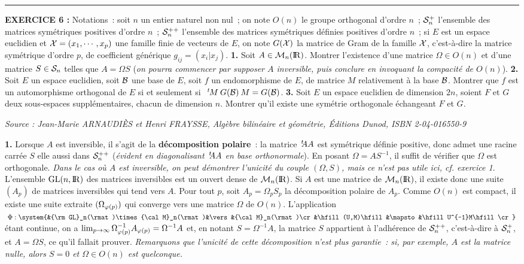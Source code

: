 \documentclass{article}
\begin{document}
\bsk
\hrule
\bsk

{\bf EXERCICE 6 :}\msk
Notations~: soit $n$ un entier naturel non nul~; on note\ssk\new
$O(n)$ le groupe orthogonal d'ordre $n$~;\ssk\new
${\cal S}_n^+$ l'ensemble des matrices sym\'etriques positives d'ordre $n$~;\ssk\new
${\cal S}_n^{++}$ l'ensemble des matrices sym\'etriques d\'efinies positives d'ordre $n$~;\ssk\new
si $E$ est un espace euclidien et ${\cal X}=(x_1,\cdots,x_p)$ une famille finie de vecteurs de $E$, on note $G({\cal X})$ la matrice de Gram de la famille ${\cal X}$, c'est-\`a-dire la matrice sym\'etrique d'ordre $p$, de coefficient g\'en\'erique $g_{ij}=(x_i|x_j)$.
\msk
{\bf 1.} Soit $A\in{\cal M}_n({\rm I\kern-0.6mm R})$. Montrer l'existence d'une matrice $\Omega\in O(n)$ et d'une matrice $S\in{\cal S}_n$ telles que $A=\Omega S$ ({\it on pourra commencer par supposer $A$ inversible, puis conclure en invoquant la compacit\'e de $O(n)$}).\msk
{\bf 2.} Soit $E$ un espace euclidien, soit ${\cal B}$ une base de $E$, soit $f$ un endomorphisme de $E$, de matrice $M$ relativement \`a la base ${\cal B}$. Montrer que $f$ est un automorphisme orthogonal de $E$ si et seulement si $\;\,{}^t\!\!\>M\>G({\cal B})\>M=G({\cal B})$.\msk
{\bf 3.} Soit $E$ un espace euclidien de dimension $2n$, soient $F$ et $G$ deux sous-espaces suppl\'ementaires, chacun de dimension $n$. Montrer qu'il existe une sym\'etrie orthogonale \'echangeant $F$ et $G$.

\msk
{\it Source : Jean-Marie ARNAUDI\`ES et Henri FRAYSSE, Alg\`ebre bilin\'eaire et g\'eom\'etrie, \'Editions Dunod, ISBN 2-04-016550-9}

\msk
\cl{- - - - - - - - - - - - - - - - - - - - - - - - - - - - - - }
\msk

{\bf 1.} Lorsque $A$ est inversible, il s'agit de la {\bf d\'ecomposition polaire}~: la matrice $\,{}^t\!\! AA$ est sym\'etrique d\'efinie positive, donc admet une racine carr\'ee $S$ elle aussi dans ${\cal S}_n^{++}$ ({\it \'evident en diago\-na\-lisant $\,{}^t\!\! AA$ en base orthonormale}). En posant $\Omega=AS^{-1}$, il suffit de v\'erifier que $\Omega$ est orthogonale.\ssk\sect
{\it Dans le cas o\`u $A$ est inversible, on peut d\'emontrer l'unicit\'e du couple $(\Omega,S)$, mais ce n'est pas utile ici, cf. exercice 1}.\msk\sect
L'ensemble ${\rm GL}(n,{\rm I\kern-0.6mm R})$ des matrices inversibles est un ouvert dense de ${\cal M}_n({\rm I\kern-0.6mm R})$. Si $A$ est une matrice de ${\cal M}_n({\rm I\kern-0.6mm R})$, il existe donc une suite $(A_p)$ de matrices inversibles qui tend vers $A$. Pour tout $p$, soit $A_p=\Omega_p S_p$ la d\'ecomposition polaire de $A_p$. Comme $O(n)$ est compact, il existe une suite extraite $(\Omega_{\varphi(p)})$ qui converge vers une matrice $\Omega$ de $O(n)$. L'application $\;\Phi:\system{&{\rm GL}_n(\rmat)\times{\cal M}_n(\rmat)&\vers&{\cal M}_n(\rmat)\cr &\hfill (U,M)\hfill&\mapsto&\hfill U^{-1}M\hfill\cr}\;$ \'etant continue, on a $\lim_{p\rightarrow\infty}\Omega_{\varphi(p)}^{-1}A_{\varphi(p)}=\Omega^{-1}A$ et, en notant $S=\Omega^{-1}A$, la matrice $S$ appartient \`a l'adh\'erence de ${\cal S}_n^{++}$, c'est-\`a-dire \`a ${\cal S}_n^+$, et $A=\Omega S$, ce qu'il fallait prouver.
\ssk\sect
{\it Remarquons que l'unicit\'e de cette d\'ecomposition n'est plus garantie~: si, par exemple, $A$ est la matrice nulle, alors $S=0$ et $\Omega\in O(n)$ est quelconque.}
\end{document}
